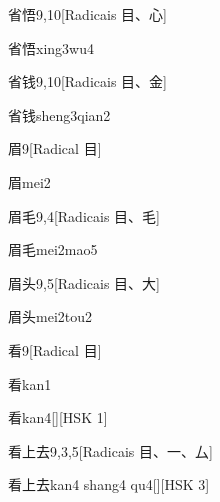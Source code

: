\begin{entry}{省悟}{9,10}[Radicais ⽬、⼼]
  \begin{phonetics}{省悟}{xing3wu4}
  \end{phonetics}
\end{entry}

\begin{entry}{省钱}{9,10}[Radicais ⽬、⾦]
  \begin{phonetics}{省钱}{sheng3qian2}
  \end{phonetics}
\end{entry}

\begin{entry}{眉}{9}[Radical ⽬]
  \begin{phonetics}{眉}{mei2}
  \end{phonetics}
\end{entry}

\begin{entry}{眉毛}{9,4}[Radicais ⽬、⽑]
  \begin{phonetics}{眉毛}{mei2mao5}
  \end{phonetics}
\end{entry}

\begin{entry}{眉头}{9,5}[Radicais ⽬、⼤]
  \begin{phonetics}{眉头}{mei2tou2}
  \end{phonetics}
\end{entry}

\begin{entry}{看}{9}[Radical ⽬]
  \begin{phonetics}{看}{kan1}
  \end{phonetics}
  \begin{phonetics}{看}{kan4}[][HSK 1]
  \end{phonetics}
\end{entry}

\begin{entry}{看上去}{9,3,5}[Radicais ⽬、⼀、⼛]
  \begin{phonetics}{看上去}{kan4 shang4 qu4}[][HSK 3]
  \end{phonetics}
\end{entry}


